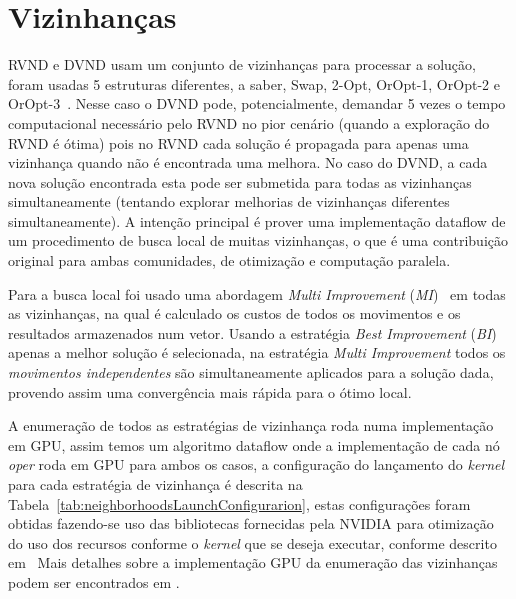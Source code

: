 \section{Vizinhanças}\label{sec:neighborhoods}

RVND e DVND usam um conjunto de vizinhanças para processar a solução, foram usadas 5 estruturas diferentes, a saber, Swap, 2-Opt, OrOpt-1, OrOpt-2 e OrOpt-3~\cite{wamca2016}.
Nesse caso o DVND pode, potencialmente, demandar 5 vezes o tempo computacional necessário pelo RVND no pior cenário (quando a exploração do RVND é ótima) pois no RVND cada solução é propagada para apenas uma vizinhança quando não é encontrada uma melhora.
No caso do DVND, a cada nova solução encontrada esta pode ser submetida para todas as vizinhanças simultaneamente (tentando explorar melhorias de vizinhanças diferentes simultaneamente).
A intenção principal é prover uma implementação dataflow de um procedimento de busca local de muitas vizinhanças, o que é uma contribuição original para ambas comunidades, de otimização e computação paralela.

Para a busca local foi usado uma abordagem \emph{Multi Improvement} (\emph{MI})~\cite{wamca2016} em todas as vizinhanças, na qual é calculado os custos de todos os movimentos e os resultados armazenados num vetor.
Usando a estratégia \emph{Best Improvement} (\emph{BI}) apenas a melhor solução é selecionada, na estratégia \emph{Multi Improvement} todos os \textit{movimentos independentes} são simultaneamente aplicados para a solução dada, provendo assim uma convergência mais rápida para o ótimo local.

A enumeração de todos as estratégias de vizinhança roda numa implementação em GPU, assim temos um algoritmo dataflow onde a implementação de cada nó \textit{oper} roda em GPU para ambos os casos, a configuração do lançamento do \emph{kernel} para cada estratégia de vizinhança é descrita na Tabela~\ref{tab:neighborhoodsLaunchConfigurarion}, estas configurações foram obtidas fazendo-se uso das bibliotecas fornecidas pela NVIDIA para otimização do uso dos recursos conforme o \emph{kernel} que se deseja executar, conforme descrito em~\cite{cudaProTipOccupancy}
Mais detalhes sobre a implementação GPU da enumeração das vizinhanças podem ser encontrados em \cite{wamca2016}.

